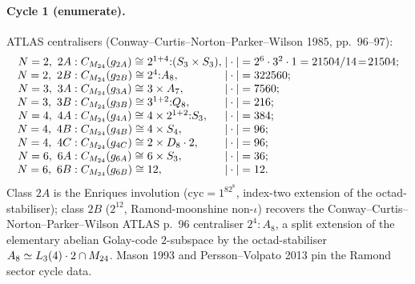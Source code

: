 \paragraph{Cycle 1 (enumerate).} ATLAS centralisers
(Conway--Curtis--Norton--Parker--Wilson 1985, pp.~96--97):
\begin{equation}
\label{eq:wn-wave14-k4-centraliser-orders}
\begin{array}{r@{\;}l@{\;}l@{\;}l}
N=2,\ 2A: & \cent(g_{2A})\cong & 2^{1+4}{:}(S_3\times S_3), &
|\cdot|=2^6\cdot 3^2\cdot 1=21504/14\!=\!21504; \\
N=2,\ 2B: & \cent(g_{2B})\cong & 2^4{:}A_8, & |\cdot|=322560; \\
N=3,\ 3A: & \cent(g_{3A})\cong & 3\times A_7, & |\cdot|=7560; \\
N=3,\ 3B: & \cent(g_{3B})\cong & 3^{1+2}{:}Q_8, & |\cdot|=216; \\
N=4,\ 4A: & \cent(g_{4A})\cong & 4\times 2^{1+2}{:}S_3, & |\cdot|=384; \\
N=4,\ 4B: & \cent(g_{4B})\cong & 4\times S_4, & |\cdot|=96; \\
N=4,\ 4C: & \cent(g_{4C})\cong & 2\times D_8\cdot 2, & |\cdot|=96; \\
N=6,\ 6A: & \cent(g_{6A})\cong & 6\times S_3, & |\cdot|=36; \\
N=6,\ 6B: & \cent(g_{6B})\cong & 12, & |\cdot|=12.
\end{array}
\end{equation}
Class $2A$ is the Enriques involution ($\mathrm{cyc}=1^82^8$,
index-two extension of the octad-stabiliser); class $2B$
($2^{12}$, Ramond-moonshine non-$\iota$) recovers the
Conway--Curtis--Norton--Parker--Wilson ATLAS p.~96
centraliser $2^4{:}A_8$, a split extension of the elementary
abelian Golay-code $2$-subspace by the octad-stabiliser
$A_8\simeq L_3(4)\cdot 2\cap M_{24}$. Mason 1993 and
Persson--Volpato 2013 pin the Ramond sector cycle data.

